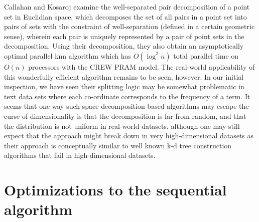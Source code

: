 \documentclass{comjnl}
\begin{document}
Callahan and Kosaroj \cite{Callahan92adecomposition,callahan1995} 
examine the well-separated pair decomposition of
a point set in Euclidian space, which decomposes the set
of all pairs in a point set into pairs of sets with the constraint of
well-separation (defined in a certain geometric sense), wherein each
pair is uniquely represented by a pair of point sets in the
decomposition.  Using their
decomposition, they also obtain an asymptotically optimal parallel knn
algorithm which has $O(\log^2n)$ total parallel time on $O(n)$
processors with the CREW PRAM model.  The real-world
applicability of this wonderfully efficient algorithm remains to be
seen, however. In our initial inspection, we have seen their splitting
logic may be somewhat problematic in text data sets where each
co-ordinate corresponds to the frequency of a term.  It seems that one
way such space decomposition based algorithms may escape the curse of
dimensionality is that the decomposition is far from random, and that
the distribution is not uniform in real-world datasets, although one
may still expect that the approach might break down in very
high-dimensional datasets as their approach is conceptually similar to well
known k-d tree construction algorithms that fail in high-dimensional datasets.

\section{Optimizations to the sequential algorithm}
\label{sec:optseq}
\end{document}
